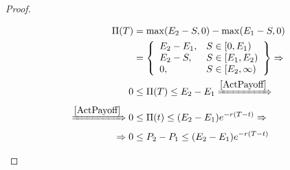 \begin{proof}
\begin{enumerate}
        \begin{align*}
            \Pi(T) &= \max(E_2 - S,0) - \max(E_1 - S,0) \\
            &= \left\{
            \begin{array}{ll}
              E_2 - E_1,       & S\in [0,E_1) \\
              E_2-S,        & S\in [E_1,E_2) \\
              0,        & S\in [E_2,\infty)
            \end{array}
            \right\} \Rightarrow \\
            0 &\leq \Pi(T) \leq E_2-E_1 \xRightarrow{\ref{ActPayoff}}\\
            \xRightarrow{\ref{ActPayoff}} 0 &\leq \Pi(t) \leq (E_2-E_1)e^{-r(T-t)} \Rightarrow \\
            \Rightarrow 0 &\leq P_2-P_1 \leq (E_2-E_1)e^{-r(T-t)}
        \end{align*}
    \end{enumerate}
\end{proof}





